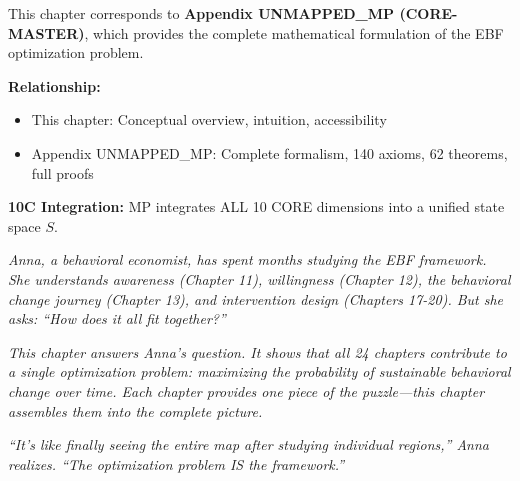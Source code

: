 \begin{tcolorbox}[colback=purple!5!white,colframe=purple!75!black,
    title=\textbf{CORE Connection: MP (CORE-MASTER)}]

This chapter corresponds to \textbf{Appendix UNMAPPED_MP (CORE-MASTER)}, which provides the complete mathematical formulation of the EBF optimization problem.

\textbf{Relationship:}
\begin{itemize}[noitemsep]
    \item This chapter: Conceptual overview, intuition, accessibility
    \item Appendix UNMAPPED_MP: Complete formalism, 140 axioms, 62 theorems, full proofs
\end{itemize}

\textbf{10C Integration:} MP integrates ALL 10 CORE dimensions into a unified state space $S$.

\end{tcolorbox}

\begin{tcolorbox}[colback=yellow!5!white,colframe=yellow!75!black,
    title=\textbf{Intuition: Anna's Journey to the Complete Picture}]

\textit{Anna, a behavioral economist, has spent months studying the EBF framework. She understands awareness (Chapter 11), willingness (Chapter 12), the behavioral change journey (Chapter 13), and intervention design (Chapters 17-20). But she asks: ``How does it all fit together?''}

\textit{This chapter answers Anna's question. It shows that all 24 chapters contribute to a single optimization problem: maximizing the probability of sustainable behavioral change over time. Each chapter provides one piece of the puzzle---this chapter assembles them into the complete picture.}

\textit{``It's like finally seeing the entire map after studying individual regions,'' Anna realizes. ``The optimization problem IS the framework.''}

\end{tcolorbox}

